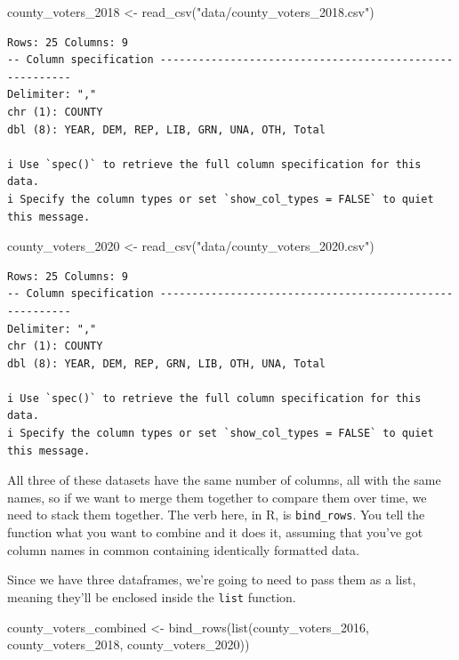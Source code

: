 \documentclass[
  letterpaper,
  DIV=11,
  numbers=noendperiod]{scrreprt}
\newenvironment{Shaded}{\begin{snugshade}}{\end{snugshade}}
\newcommand{\FunctionTok}[1]{\textcolor[rgb]{0.28,0.35,0.67}{#1}}
\newcommand{\NormalTok}[1]{\textcolor[rgb]{0.00,0.23,0.31}{#1}}
\newcommand{\OtherTok}[1]{\textcolor[rgb]{0.00,0.23,0.31}{#1}}
\newcommand{\StringTok}[1]{\textcolor[rgb]{0.13,0.47,0.30}{#1}}
\begin{document}
\begin{Shaded}
\begin{Highlighting}[]
\NormalTok{county\_voters\_2018 }\OtherTok{\textless{}{-}} \FunctionTok{read\_csv}\NormalTok{(}\StringTok{"data/county\_voters\_2018.csv"}\NormalTok{)}
\end{Highlighting}
\end{Shaded}

\begin{verbatim}
Rows: 25 Columns: 9
-- Column specification --------------------------------------------------------
Delimiter: ","
chr (1): COUNTY
dbl (8): YEAR, DEM, REP, LIB, GRN, UNA, OTH, Total

i Use `spec()` to retrieve the full column specification for this data.
i Specify the column types or set `show_col_types = FALSE` to quiet this message.
\end{verbatim}

\begin{Shaded}
\begin{Highlighting}[]
\NormalTok{county\_voters\_2020 }\OtherTok{\textless{}{-}} \FunctionTok{read\_csv}\NormalTok{(}\StringTok{"data/county\_voters\_2020.csv"}\NormalTok{)}
\end{Highlighting}
\end{Shaded}

\begin{verbatim}
Rows: 25 Columns: 9
-- Column specification --------------------------------------------------------
Delimiter: ","
chr (1): COUNTY
dbl (8): YEAR, DEM, REP, GRN, LIB, OTH, UNA, Total

i Use `spec()` to retrieve the full column specification for this data.
i Specify the column types or set `show_col_types = FALSE` to quiet this message.
\end{verbatim}

All three of these datasets have the same number of columns, all with
the same names, so if we want to merge them together to compare them
over time, we need to stack them together. The verb here, in R, is
\texttt{bind\_rows}. You tell the function what you want to combine and
it does it, assuming that you've got column names in common containing
identically formatted data.

Since we have three dataframes, we're going to need to pass them as a
list, meaning they'll be enclosed inside the \texttt{list} function.

\begin{Shaded}
\begin{Highlighting}[]
\NormalTok{county\_voters\_combined }\OtherTok{\textless{}{-}} \FunctionTok{bind\_rows}\NormalTok{(}\FunctionTok{list}\NormalTok{(county\_voters\_2016, county\_voters\_2018, county\_voters\_2020))}
\end{Highlighting}
\end{Shaded}
\end{document}
